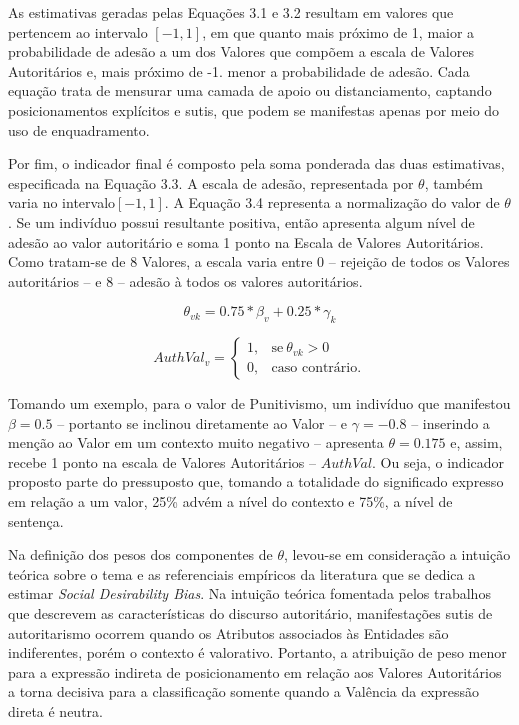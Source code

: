 \documentclass[
12pt,				%
openright,			%
twoside,			%
a4paper,			%
english,			%
french,				%
spanish,			%
brazil				%
]{abntex2}
\begin{document}
As estimativas geradas pelas Equações 3.1 e 3.2 resultam em valores que pertencem ao intervalo $[-1, 1]$, em que quanto mais próximo de 1, maior a probabilidade de adesão a um dos Valores que compõem a escala de Valores Autoritários e, mais próximo de -1. menor a probabilidade de adesão. Cada equação trata de mensurar uma camada de apoio ou distanciamento, captando posicionamentos explícitos e sutis, que podem se manifestas apenas por meio do uso de enquadramento.

Por fim, o indicador final é composto pela soma ponderada das duas estimativas, especificada na Equação 3.3. A escala de adesão, representada por $\theta$, também varia no intervalo$[-1, 1]$. A Equação 3.4 representa a normalização do valor de $\theta$. Se um indivíduo possui resultante positiva, então apresenta algum nível de adesão ao valor autoritário e soma 1 ponto na Escala de Valores Autoritários. Como tratam-se de 8 Valores, a escala varia entre 0 -- rejeição de todos os Valores autoritários -- e 8 -- adesão à todos os valores autoritários.

\begin{equation}
\theta_{vk} = 0.75 * \beta_v +  0.25 * \gamma_k
\end{equation}

\begin{equation}
AuthVal_v = 
\begin{cases}
1, & \text{se}\ \theta_{vk} > 0 \\
0, & \text{caso contrário.}
\end{cases}
\end{equation}

Tomando um exemplo, para o valor de Punitivismo, um indivíduo que manifestou $\beta = 0.5$ -- portanto se inclinou diretamente ao Valor -- e $\gamma = -0.8$ -- inserindo a menção ao Valor em um contexto muito negativo -- apresenta $\theta = 0.175$ e, assim, recebe 1 ponto na escala de Valores Autoritários -- $AuthVal$. Ou seja, o indicador proposto parte do pressuposto que, tomando a totalidade do significado expresso em relação a um valor, 25{\%} advém a nível do contexto e 75{\%}, a nível de sentença. 

Na definição dos pesos dos componentes de $\theta$, levou-se em consideração a intuição teórica sobre o tema e as referenciais empíricos da literatura que se dedica a estimar \emph{Social Desirability Bias}. Na intuição teórica fomentada pelos trabalhos que descrevem as características do discurso autoritário, manifestações sutis de autoritarismo ocorrem quando os Atributos associados às Entidades são indiferentes, porém o contexto é valorativo. Portanto, a atribuição de peso menor para a expressão indireta de posicionamento em relação aos Valores Autoritários a torna decisiva para a classificação somente quando a Valência da expressão direta é neutra.
\end{document}
